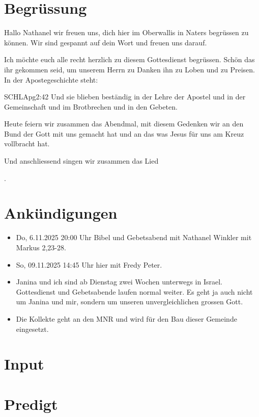 \documentclass{mybib}
\begin{document}
\section{Begrüssung}
Hallo Nathanel wir freuen uns, dich hier im Oberwallis in Naters begrüssen zu können. Wir sind gespannt auf dein Wort und freuen uns darauf.

Ich möchte euch alle recht herzlich zu diesem Gottesdienst begrüssen. Schön das ihr gekommen seid, um unserem Herrn zu Danken ihn zu Loben und zu Preisen.
In der Apostegeschichte steht: 
\begin{bibelbox}{SCHL}{Apg}{2:42}
    Und sie blieben beständig in der Lehre der Apostel und in der Gemeinschaft und im Brotbrechen und in den Gebeten.
\end{bibelbox}
Heute feiern wir zusammen das Abendmal, mit diesem Gedenken wir an den Bund der Gott mit uns gemacht hat und an das was Jesus für uns am Kreuz vollbracht hat.

\beten{} Und anschliessend singen wir zusammen das Lied

{}.

\section{Ankündigungen}
\begin{itemize}
    \item {} Do, 6.11.2025 20:00 Uhr Bibel und Gebetsabend mit Nathanel Winkler mit Markus 2,23-28.
    \item {} So, 09.11.2025 14:45 Uhr hier mit Fredy Peter.
    \item {} Janina und ich sind ab Dienstag zwei Wochen unterwegs in Israel. Gottesdienst und Gebetsabende laufen normal weiter. Es geht ja auch nicht um Janina und mir, sondern um unseren unvergleichlichen grossen Gott. 
    \item {} Die Kollekte geht an den MNR und wird für den Bau dieser Gemeinde eingesetzt.
\end{itemize}

\section{ Input }    

\section{Predigt}
\end{document}
